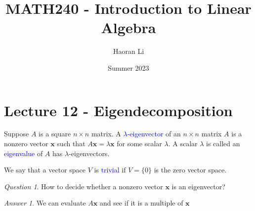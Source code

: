 \documentclass{beamer}
\title{MATH240 - Introduction to Linear Algebra}
\author{Haoran Li}
\institute[UMD]{University of Maryland, College Park}
\date{Summer 2023}
\theoremstyle{definition}
\theoremstyle{remark}
\newtheorem*{question}{Question}
\newtheorem*{answer}{Answer}
\begin{document}
\maketitle

\section{Lecture 12 - Eigendecomposition}

\begin{frame}[t]
\begin{definition}
Suppose $A$ is a square $n\times n$ matrix. A \textcolor{blue}{$\lambda$-eigenvector} of an $n\times n$ matrix $A$ is a nonzero vector $\mathbf x$ such that $A\mathbf x = \lambda\mathbf x$ for some scalar $\lambda$\pause. A scalar $\lambda$ is called an \textcolor{blue}{eigenvalue} of $A$ has $\lambda$-eigenvectors.
\end{definition}
\pause
\begin{definition}
We say that a vector space $V$ is \textcolor{blue}{trivial} if $V=\{0\}$ is the zero vector space.
\end{definition}
\pause
\begin{question}
How to decide whether a nonzero vector $\mathbf x$ is an eigenvector?
\end{question}
\pause
\begin{answer}
We can evaluate $A\mathbf x$ and see if it is a multiple of $\mathbf x$
\end{answer}
\end{frame}
\end{document}
